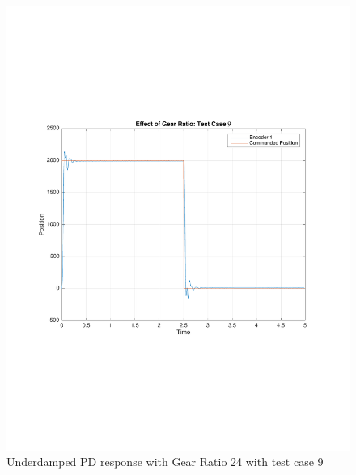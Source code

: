 \documentclass[11pt, a4paper]{article}
\begin{document}
\begin{figure}[H]
\centering
\includegraphics[width = \textwidth]{gr_tc9.pdf}
\caption{Underdamped PD response with Gear Ratio 24 with test case 9}
\end{figure}
\end{document}

